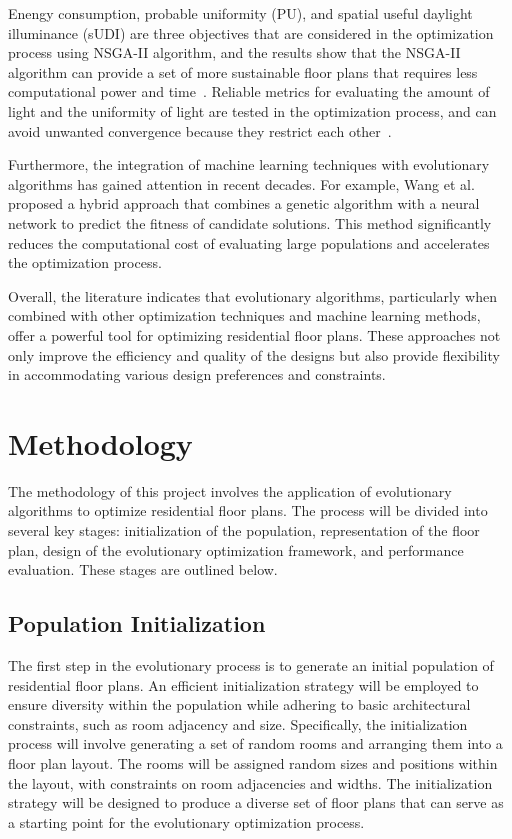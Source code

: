 \documentclass[]{article}
\begin{document}
Enengy consumption, probable uniformity (PU), and spatial useful daylight illuminance (sUDI) are three objectives that are considered in the optimization process using NSGA-II algorithm, and the results show that the NSGA-II algorithm can provide a set of more sustainable floor plans that requires less computational power and time~\cite{CHAICHI2024108842}. Reliable metrics for evaluating the amount of light and the uniformity of light are tested in the optimization process, and can avoid unwanted convergence because they restrict each other~\cite{CHAICHI2024108842}.

Furthermore, the integration of machine learning techniques with evolutionary algorithms has gained attention in recent decades. For example, Wang et al.~\cite{WANG20051329} proposed a hybrid approach that combines a genetic algorithm with a neural network to predict the fitness of candidate solutions. This method significantly reduces the computational cost of evaluating large populations and accelerates the optimization process.

Overall, the literature indicates that evolutionary algorithms, particularly when combined with other optimization techniques and machine learning methods, offer a powerful tool for optimizing residential floor plans. These approaches not only improve the efficiency and quality of the designs but also provide flexibility in accommodating various design preferences and constraints.

\section{Methodology}
The methodology of this project involves the application of evolutionary algorithms to optimize residential floor plans. The process will be divided into several key stages: initialization of the population, representation of the floor plan, design of the evolutionary optimization framework, and performance evaluation. These stages are outlined below.

\subsection{Population Initialization}
The first step in the evolutionary process is to generate an initial population of residential floor plans. An efficient initialization strategy will be employed to ensure diversity within the population while adhering to basic architectural constraints, such as room adjacency and size. Specifically, the initialization process will involve generating a set of random rooms and arranging them into a floor plan layout. The rooms will be assigned random sizes and positions within the layout, with constraints on room adjacencies and widths. The initialization strategy will be designed to produce a diverse set of floor plans that can serve as a starting point for the evolutionary optimization process.
\end{document}
